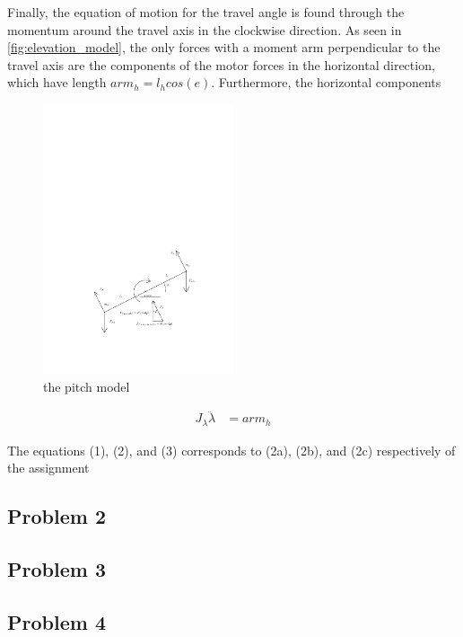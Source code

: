 Finally, the equation of motion for the travel angle is found through the momentum around the travel axis in the  clockwise direction. As seen in \cref{fig:elevation_model}, the only forces with a moment arm perpendicular to the travel axis are the components of the motor forces in the horizontal direction, which have length $arm_h = l_hcos(e)$. Furthermore, the horizontal components

\begin{figure}[H]
\caption{the pitch model}
\label{fig:pitch_model}
\includegraphics[width=0.5\textwidth]{images/pitch_model}
\end{figure}

\begin{align*}
J_\lambda\ddot{\lambda} &= arm_h
\end{align*}

The equations (1), (2), and (3) corresponds to (2a), (2b), and (2c) respectively of the assignment \cite[p.13]{assignment}

\subsection{Problem 2}
\subsection{Problem 3}
\subsection{Problem 4}
